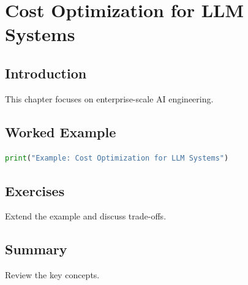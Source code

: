 \chapter{Cost Optimization for LLM Systems}
\label{chap:vol10-14}



\section{Introduction}
This chapter focuses on enterprise-scale AI engineering.

\section{Worked Example}
\begin{lstlisting}[language=Python]
print("Example: Cost Optimization for LLM Systems")
\end{lstlisting}

\section{Exercises}
\begin{exercise}
Extend the example and discuss trade-offs.
\end{exercise}

\section{Summary}
Review the key concepts.
